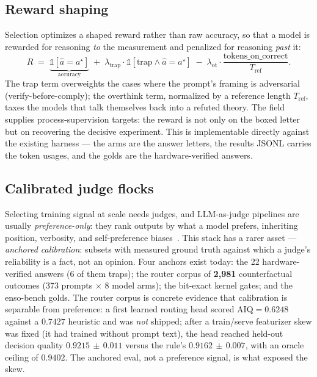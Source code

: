 \documentclass[11pt]{article}
\begin{document}
\subsection{Reward shaping}
\label{sec:reward}

Selection optimizes a shaped reward rather than raw accuracy, so that a model is rewarded for reasoning
\emph{to} the measurement and penalized for reasoning \emph{past} it:
\[
R \;=\; \underbrace{\mathbb{1}[\hat a = a^\star]}_{\text{accuracy}}
\;+\; \lambda_{\mathrm{trap}}\cdot \mathbb{1}[\text{trap} \wedge \hat a = a^\star]
\;-\; \lambda_{\mathrm{ot}}\cdot \frac{\mathrm{tokens\_on\_correct}}{T_{\mathrm{ref}}} .
\]
The trap term overweights the cases where the prompt's framing is adversarial (verify-before-comply); the
overthink term, normalized by a reference length $T_{\mathrm{ref}}$, taxes the models that talk themselves
back into a refuted theory. The  field supplies process-supervision targets: the reward is
not only on the boxed letter but on recovering the decisive experiment. This is implementable directly
against the existing harness --- the arms are the answer letters, the results JSONL carries the token usages,
and the golds are the hardware-verified answers.

\subsection{Calibrated judge flocks}
\label{sec:judges}

Selecting training signal at scale needs judges, and LLM-as-judge pipelines are usually \emph{preference-only}:
they rank outputs by what a model prefers, inheriting position, verbosity, and self-preference
biases~\cite{judgebias}. This stack has a rarer asset --- \emph{anchored calibration}: subsets with measured
ground truth against which a judge's reliability is a fact, not an opinion. Four anchors exist today: the 22
hardware-verified  answers (6 of them traps); the router corpus of \textbf{2{,}981}
counterfactual outcomes (373 prompts $\times$ 8 model arms); the bit-exact kernel gates; and the enso-bench
golds. The router corpus is
concrete evidence that calibration is separable from preference: a first learned routing head scored
$\mathrm{AIQ}=0.6248$ against a $0.7427$ heuristic and was \emph{not} shipped; after a train/serve featurizer
skew was fixed (it had trained without prompt text), the head reached held-out decision quality
$0.9215\,{\pm}\,0.011$ versus the rule's $0.9162\,{\pm}\,0.007$, with an oracle ceiling of $0.9402$. The
anchored eval, not a preference signal, is what exposed the skew.
\end{document}
